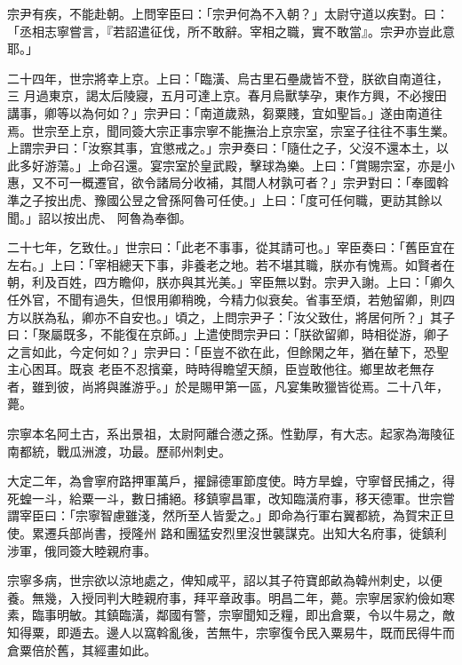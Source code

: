 \begin{pinyinscope}
 宗尹有疾，不能赴朝。上問宰臣曰：「宗尹何為不入朝？」太尉守道以疾對。曰：「丞相志寧嘗言，『若詔遣征伐，所不敢辭。宰相之職，實不敢當』。宗尹亦豈此意耶。」



 二十四年，世宗將幸上京。上曰：「臨潢、烏古里石壘歲皆不登，朕欲自南道往，三
 月過東京，謁太后陵寢，五月可達上京。春月烏獸孳孕，東作方興，不必搜田講事，卿等以為何如？」宗尹曰：「南道歲熟，芻粟賤，宜如聖旨。」遂由南道往焉。世宗至上京，聞同簽大宗正事宗寧不能撫治上京宗室，宗室子往往不事生業。上謂宗尹曰：「汝察其事，宜懲戒之。」宗尹奏曰：「隨仕之子，父沒不還本土，以此多好游蕩。」上命召還。宴宗室於皇武殿，擊球為樂。上曰：「賞賜宗室，亦是小惠，又不可一概遷官，欲令諸局分收補，其間人材孰可者？」宗尹對曰：「奉國斡準之子按出虎、豫國公昱之曾孫阿魯可任使。」上曰：「度可任何職，更訪其餘以聞。」詔以按出虎、
 阿魯為奉御。



 二十七年，乞致仕。」世宗曰：「此老不事事，從其請可也。」宰臣奏曰：「舊臣宜在左右。」上曰：「宰相總天下事，非養老之地。若不堪其職，朕亦有愧焉。如賢者在朝，利及百姓，四方瞻仰，朕亦與其光美。」宰臣無以對。宗尹入謝。上曰：「卿久任外官，不聞有過失，但恨用卿稍晚，今精力似衰矣。省事至煩，若勉留卿，則四方以朕為私，卿亦不自安也。」頃之，上問宗尹子：「汝父致仕，將居何所？」其子曰：「聚屬既多，不能復在京師。」上遣使問宗尹曰：「朕欲留卿，時相從游，卿子之言如此，今定何如？」宗尹曰：「臣豈不欲在此，但餘閑之年，猶在輦下，恐聖主心困耳。既哀
 老臣不忍擯棄，時時得瞻望天顏，臣豈敢他往。鄉里故老無存者，雖到彼，尚將與誰游乎。」於是賜甲第一區，凡宴集畋獵皆從焉。二十八年，薨。



 宗寧本名阿土古，系出景祖，太尉阿離合懣之孫。性勤厚，有大志。起家為海陵征南都統，戰瓜洲渡，功最。歷祁州刺史。



 大定二年，為會寧府路押軍萬戶，擢歸德軍節度使。時方旱蝗，守寧督民捕之，得死蝗一斗，給粟一斗，數日捕絕。移鎮寧昌軍，改知臨潢府事，移天德軍。世宗嘗謂宰臣曰：「宗寧智慮雖淺，然所至人皆愛之。」即命為行軍右翼都統，為賀宋正旦使。累遷兵部尚書，授隆州
 路和團猛安烈里沒世襲謀克。出知大名府事，徙鎮利涉軍，俄同簽大睦親府事。



 宗寧多病，世宗欲以涼地處之，俾知咸平，詔以其子符寶郎畝為韓州刺史，以便養。無幾，入授同判大睦親府事，拜平章政事。明昌二年，薨。宗寧居家約儉如寒素，臨事明敏。其鎮臨潢，鄰國有警，宗寧聞知乏糧，即出倉粟，令以牛易之，敵知得粟，即遁去。邊人以窩斡亂後，苦無牛，宗寧復令民入粟易牛，既而民得牛而倉粟倍於舊，其經畫如此。




\end{pinyinscope}
